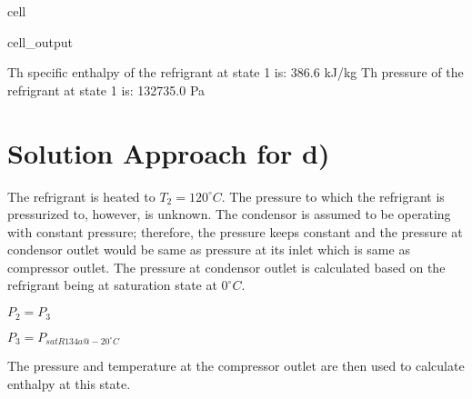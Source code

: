 \documentclass[letterpaper,10pt,english]{jupyterBook}
\begin{document}
\begin{sphinxuseclass}{cell}
\begin{sphinxVerbatimOutput}
\begin{sphinxuseclass}{cell_output}
\begin{sphinxVerbatim}[commandchars=\\\{\}]
Th specific enthalpy of the refrigrant at state \PYGZsh{}1 is: 386.6 kJ/kg
Th pressure of the refrigrant at state \PYGZsh{}1 is: 132735.0 Pa
\end{sphinxVerbatim}

\end{sphinxuseclass}\end{sphinxVerbatimOutput}

\end{sphinxuseclass}

\section{Solution Approach for d)}
\label{\detokenize{notebooks/Chapter5/CH5-Q5:solution-approach-for-d}}
\sphinxAtStartPar
The refrigrant is heated to \(T_2=120^{\circ}  C\). The pressure to which the refrigrant is pressurized to, however, is unknown. The condensor is assumed to be operating with constant pressure; therefore, the pressure keeps constant and the pressure at condensor outlet would be same as pressure at its inlet which is same as compressor outlet. The pressure at condensor outlet is calculated based on the refrigrant being at saturation state at \(0^{\circ}  C\).

\sphinxAtStartPar
\(P_2=P_3\)

\sphinxAtStartPar
\(P_3=P_{satR134a@-20^{\circ}  C}\)

\sphinxAtStartPar
The pressure and temperature at the compressor outlet are then used to calculate enthalpy at this state.
\end{document}
